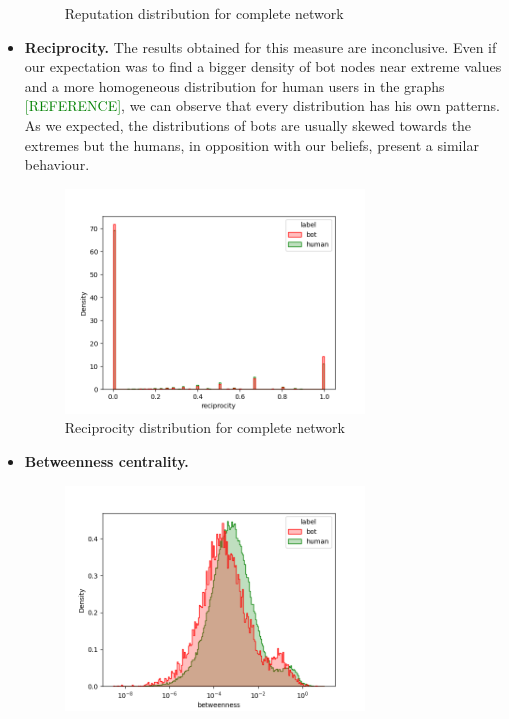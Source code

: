 \documentclass[12pt, a4paper]{article}
\begin{document}
\begin{itemize}
\begin{figure}[H]
                    \caption{Reputation distribution for complete network}
                \end{figure}
			\item \textbf{Reciprocity.} The results obtained for this measure are inconclusive. Even if our expectation was to find a bigger density of bot nodes near extreme values and a more homogeneous distribution for human users in the graphs \textcolor{green}{[REFERENCE]}, we can observe that every distribution has his own patterns. As we expected, the distributions of bots are usually skewed towards the extremes but the humans, in opposition with our beliefs, present a similar behaviour.
				\begin{figure}[H]
                	\centering
                    \includegraphics[width=0.75\textwidth]{results/complete_reciprocity.png}
                    \caption{Reciprocity distribution for complete network}
                \end{figure}
			\item \textbf{Betweenness centrality.}
                \begin{figure}[H]
                    \centering
                    \includegraphics[width=0.75\textwidth]{results/complete_betweenness.png}

\end{figure}
\end{itemize}
\end{document}
